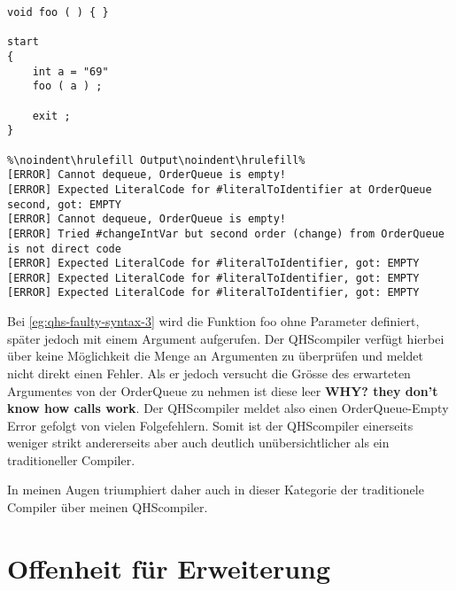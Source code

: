 \begin{lstlisting}[language=QHS, caption=QHS mit fehlerhaftem Syntax, label=eg:qhs-faulty-syntax-3]
void foo ( ) { }

start
{
    int a = "69" 
    foo ( a ) ;

    exit ;
}

%\noindent\hrulefill Output\noindent\hrulefill%
[ERROR] Cannot dequeue, OrderQueue is empty!
[ERROR] Expected LiteralCode for #literalToIdentifier at OrderQueue second, got: EMPTY
[ERROR] Cannot dequeue, OrderQueue is empty!
[ERROR] Tried #changeIntVar but second order (change) from OrderQueue is not direct code
[ERROR] Expected LiteralCode for #literalToIdentifier, got: EMPTY
[ERROR] Expected LiteralCode for #literalToIdentifier, got: EMPTY
[ERROR] Expected LiteralCode for #literalToIdentifier, got: EMPTY
\end{lstlisting}

Bei \ref{eg:qhs-faulty-syntax-3} wird die Funktion foo ohne Parameter definiert, später jedoch mit einem Argument aufgerufen. Der QHScompiler verfügt hierbei über keine Möglichkeit die Menge an Argumenten zu überprüfen
und meldet nicht direkt einen Fehler. Als er jedoch versucht die Grösse des erwarteten Argumentes von der OrderQueue zu nehmen ist diese leer \textbf{WHY? they don't know how calls work}.
Der QHScompiler meldet also einen OrderQueue-Empty Error gefolgt von vielen Folgefehlern.
Somit ist der QHScompiler einerseits weniger strikt andererseits aber auch deutlich unübersichtlicher als ein traditioneller Compiler.

In meinen Augen triumphiert daher auch in dieser Kategorie der traditionele Compiler über meinen QHScompiler.

\section{Offenheit für Erweiterung}